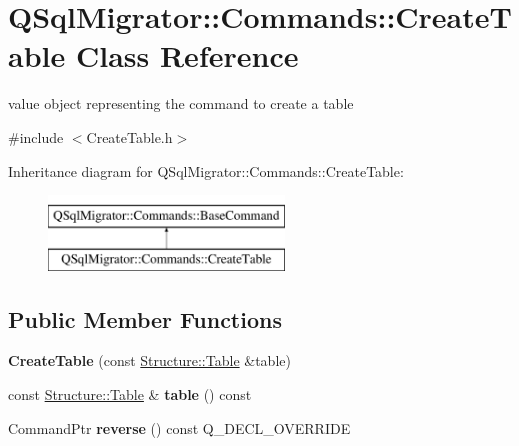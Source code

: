 \hypertarget{class_q_sql_migrator_1_1_commands_1_1_create_table}{}\section{Q\+Sql\+Migrator\+:\+:Commands\+:\+:Create\+Table Class Reference}
\label{class_q_sql_migrator_1_1_commands_1_1_create_table}


value object representing the command to create a table  




{\ttfamily \#include $<$Create\+Table.\+h$>$}

Inheritance diagram for Q\+Sql\+Migrator\+:\+:Commands\+:\+:Create\+Table\+:\begin{figure}[H]
\begin{center}
\leavevmode
\includegraphics[height=2.000000cm]{class_q_sql_migrator_1_1_commands_1_1_create_table}
\end{center}
\end{figure}
\subsection*{Public Member Functions}
\begin{DoxyCompactItemize}
\item 
\mbox{\label{class_q_sql_migrator_1_1_commands_1_1_create_table_a583435cb84744f93c2263c011ff2cdef}} 
{\bfseries Create\+Table} (const \hyperlink{class_q_sql_migrator_1_1_structure_1_1_table}{Structure\+::\+Table} \&table)
\item 
\mbox{\label{class_q_sql_migrator_1_1_commands_1_1_create_table_a4ac559bfc140b2eb27e067a2aa18105a}} 
const \hyperlink{class_q_sql_migrator_1_1_structure_1_1_table}{Structure\+::\+Table} \& {\bfseries table} () const
\item 
\mbox{\label{class_q_sql_migrator_1_1_commands_1_1_create_table_acaf06336a0c7e0b195034cbb7a49f3e7}} 
Command\+Ptr {\bfseries reverse} () const Q\+\_\+\+D\+E\+C\+L\+\_\+\+O\+V\+E\+R\+R\+I\+DE
\end{DoxyCompactItemize}
